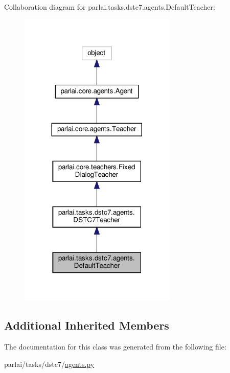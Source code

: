 Collaboration diagram for parlai.\+tasks.\+dstc7.\+agents.\+Default\+Teacher\+:
\nopagebreak
\begin{figure}[H]
\begin{center}
\leavevmode
\includegraphics[width=212pt]{classparlai_1_1tasks_1_1dstc7_1_1agents_1_1DefaultTeacher__coll__graph}
\end{center}
\end{figure}
\subsection*{Additional Inherited Members}


The documentation for this class was generated from the following file\+:\begin{DoxyCompactItemize}
\item 
parlai/tasks/dstc7/\hyperlink{parlai_2tasks_2dstc7_2agents_8py}{agents.\+py}\end{DoxyCompactItemize}
